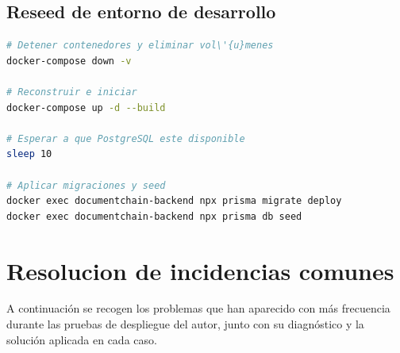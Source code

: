 \documentclass[11pt, a4paper]{article}
\begin{document}
\subsection{Reseed de entorno de desarrollo}

\begin{lstlisting}[language=bash, caption={reseed-dev.ps1 - Reseteo completo del entorno de desarrollo}]
# Detener contenedores y eliminar vol\'{u}menes
docker-compose down -v

# Reconstruir e iniciar
docker-compose up -d --build

# Esperar a que PostgreSQL este disponible
sleep 10

# Aplicar migraciones y seed
docker exec documentchain-backend npx prisma migrate deploy
docker exec documentchain-backend npx prisma db seed
\end{lstlisting}

\section{Resolucion de incidencias comunes}

A continuaci\'on se recogen los problemas que han aparecido con m\'as frecuencia durante las pruebas de despliegue del autor, junto con su diagn\'ostico y la soluci\'on aplicada en cada caso.
\end{document}

